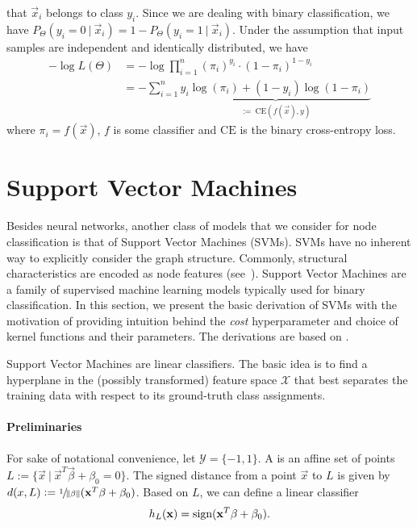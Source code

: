 \documentclass[
	fontsize=10pt, %
	twoside=false, %
	secnumdepth=1, %
  toc=indentunnumbered %
]{kaobook}
\begin{document}
that $\vec x_i$ belongs to class $y_i$. Since we are dealing with binary
classification, we have $P_\Theta(y_i=0~|~\vec x_i) = 1 - P_\Theta(y_i=1~|~\vec
x_i)$. Under the assumption that input samples are independent and identically
distributed, we have
\begin{align*}
  -\log L(\Theta)  &= -\log \prod_{i=1}^n (\pi_i)^{y_i} \cdot (1-\pi_i)^{1-y_i} \\
                   &= - \sum_{i=1}^n \underbrace{y_i \log(\pi_i) + (1-y_i) \log(1-\pi_i)}_{:=~ \text{CE}(f(\vec x), y)}
    \label{eq:bce-loss-basic}
\end{align*}
where $\pi_i = f(\vec x)$, $f$ is some classifier and $\text{CE}$ is the binary
cross-entropy loss.

\section{Support Vector Machines}

Besides neural networks, another class of models that we consider for node
classification is that of Support Vector Machines (SVMs). SVMs have no inherent
way to explicitly consider the graph structure. Commonly, structural
characteristics are encoded as node features
(see~). Support Vector Machines are a family
of supervised machine learning models typically used for binary classification.
In this section, we present the basic derivation of SVMs with the motivation of
providing intuition behind the \textit{cost} hyperparameter and choice of kernel
functions and their parameters. The derivations are based on
\citeauthor{tibshirani_ElementsStatisticalLearning_2017}
\cite{tibshirani_ElementsStatisticalLearning_2017}.

Support Vector Machines are linear classifiers. The basic idea is to find a
hyperplane in the (possibly transformed) feature space $\mathcal{X}$ that best
separates the training data with respect to its ground-truth class assignments.

\paragraph{Preliminaries} For sake of notational convenience, let $\mathcal{Y} =
\{-1, 1\}$. A  is an affine set of points $L := \{\vec x~|~ \vec
x^T \vec \beta + \beta_0 = 0\}$. The signed distance from a point $\vec x$ to $L$ is
given by $d(x, L) := \nicefrac{1}{\norm\beta} (\mathbf{x}^T \mathbf{\beta} + \beta_0)$. Based
on $L$, we can define a linear classifier
\begin{align}
  h_L(\mathbf{x}) = \text{sign}(\mathbf{x}^T \mathbf{\beta} + \beta_0).
  \label{eq:linear-classifier}
\end{align}
\end{document}
